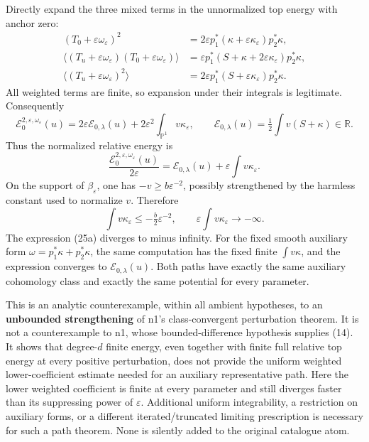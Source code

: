 \documentclass[
  11pt,
]{article}
\begin{document}
Directly expand the three mixed terms in the unnormalized top energy
with anchor zero: \[
\begin{aligned}
(T_0+\varepsilon\omega_\varepsilon)^2
 &=2\varepsilon p_1^*(\kappa+\varepsilon\kappa_\varepsilon)p_2^*\kappa,\\
\langle(T_u+\varepsilon\omega_\varepsilon)(T_0+\varepsilon\omega_\varepsilon)\rangle
 &=\varepsilon p_1^*(S+\kappa+2\varepsilon\kappa_\varepsilon)p_2^*\kappa,\\
\langle(T_u+\varepsilon\omega_\varepsilon)^2\rangle
 &=2\varepsilon p_1^*(S+\varepsilon\kappa_\varepsilon)p_2^*\kappa.
\end{aligned}
\] All weighted terms are finite, so expansion under their integrals is
legitimate. Consequently \[
\mathcal{E}^{2,\varepsilon,\omega_\varepsilon}_0(u)
=2\varepsilon\mathcal{E}_{0,\lambda}(u)
 +2\varepsilon^2\int_{\mathbb{P}^1}v\kappa_\varepsilon,
\qquad
\mathcal{E}_{0,\lambda}(u)=\tfrac12\int v(S+\kappa)\in\mathbb{R}.
\tag{24a}
\] Thus the normalized relative energy is \[
\frac{\mathcal{E}^{2,\varepsilon,\omega_\varepsilon}_0(u)}{2\varepsilon}
=\mathcal{E}_{0,\lambda}(u)+\varepsilon\int v\kappa_\varepsilon.
\tag{25a}
\] On the support of \(\beta_\varepsilon\), one has
\(-v\geq b\varepsilon^{-2}\), possibly strengthened by the harmless
constant used to normalize \(v\). Therefore \[
\int v\kappa_\varepsilon\leq-\tfrac b2\varepsilon^{-2},
\qquad
\varepsilon\int v\kappa_\varepsilon\longrightarrow-\infty.
\] The expression (25a) diverges to minus infinity. For the fixed smooth
auxiliary form \(\omega=p_1^*\kappa+p_2^*\kappa\), the same computation
has the fixed finite \(\int v\kappa\), and the expression converges to
\(\mathcal{E}_{0,\lambda}(u)\). Both paths have exactly the same
auxiliary cohomology class and exactly the same potential for every
parameter.

This is an analytic counterexample, within all ambient hypotheses, to an
\textbf{unbounded strengthening} of n1's class-convergent perturbation
theorem. It is not a counterexample to n1, whose bounded-difference
hypothesis supplies (14). It shows that degree-\(d\) finite energy, even
together with finite full relative top energy at every positive
perturbation, does not provide the uniform weighted lower-coefficient
estimate needed for an auxiliary representative path. Here the lower
weighted coefficient is finite at every parameter and still diverges
faster than its suppressing power of \(\varepsilon\). Additional uniform
integrability, a restriction on auxiliary forms, or a different
iterated/truncated limiting prescription is necessary for such a path
theorem. None is silently added to the original catalogue atom.
\end{document}
